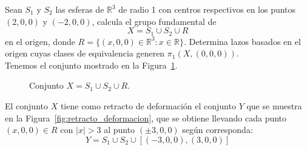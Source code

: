 \documentclass[12pt]{article}
\begin{document}
    \begin{ejercicio}
        Sean $S_1$ y $S_2$ las esferas de $\mathbb{R}^3$ de radio 1 con centros respectivos en los puntos $(2,0,0)$ y $(-2,0,0)$, calcula el grupo fundamental de
        \begin{equation*}
            X = S_1\cup S_2\cup R
        \end{equation*}
        en el origen, donde $R = \{(x,0,0)\in \mathbb{R}^3 : x\in \mathbb{R}\}$. Determina lazos basados en el origen cuyas clases de equivalencia generen $\pi_1(X,(0,0,0))$.\\

        \noindent
        Tenemos el conjunto mostrado en la Figura~\ref{fig:esferas_conexion}.
        \begin{figure}[ht]
            \centering
            \caption{Conjunto $X = S_1\cup S_2\cup R$.}
            \label{fig:esferas_conexion}
        \end{figure}
        
        El conjunto $X$ tiene como retracto de deformación el conjunto $Y$ que se muestra en la Figura~\ref{fig:retracto_deformacion}, que se obtiene llevando cada punto $(x,0,0)\in R$ con $|x|>3$ al punto $(\pm 3,0,0)$ según corresponda:
        \begin{equation*}
            Y = S_1\cup S_2\cup [(-3,0,0), (3,0,0)]
        \end{equation*}
        \begin{figure}[H]
            \centering
\end{figure}
\end{ejercicio}
\end{document}
